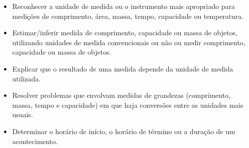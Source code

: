 \begin{itemize}
    \item Reconhecer a unidade de medida ou o instrumento mais apropriado para
medições de comprimento, área, massa, tempo, capacidade ou temperatura.

    \item Estimar/inferir medida de comprimento, capacidade ou massa de objetos,
utilizando unidades de medida convencionais ou não ou medir comprimento,
capacidade ou massa de objetos.

    \item Explicar que o resultado de uma medida depende da unidade de medida
utilizada.

    \item Resolver problemas que envolvam medidas de grandezas (comprimento,
massa, tempo e capacidade) em que haja conversões entre as unidades mais
usuais.

    \item Determinar o horário de início, o horário de término ou a duração de
um acontecimento.
\end{itemize}




